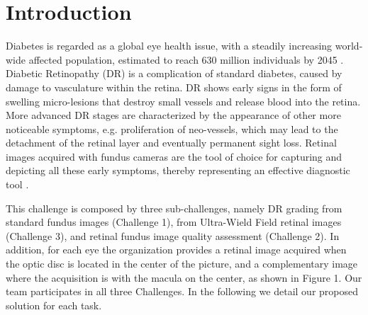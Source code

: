 \section{Introduction}
Diabetes is regarded as a global eye health issue, with a steadily increasing world-wide affected population, estimated to reach 630 million individuals by 2045 \cite{noauthor_who_nodate}. Diabetic Retinopathy (DR) is a complication of standard diabetes, caused by damage to vasculature within the retina. DR shows early signs in the form of swelling micro-lesions that destroy small vessels and release blood into the retina. More advanced DR stages are characterized by the appearance of other more noticeable symptoms, e.g. proliferation of neo-vessels, which may lead to the detachment of the retinal layer and eventually
permanent sight loss. Retinal images acquired with fundus cameras are the tool of choice for capturing and depicting all these early symptoms, thereby representing an effective diagnostic tool \cite{fenner_advances_2018}. 

This challenge is composed by three sub-challenges, namely DR grading from standard fundus images (Challenge 1), from Ultra-Wield Field retinal images (Challenge 3), and retinal fundus image quality assessment (Challenge 2). 
In addition, for each eye the organization provides a retinal image acquired when the optic disc is located in the center of the picture, and a complementary image where the acquisition is with the macula on the center, as shown in Figure 1. Our team  participates in all three Challenges. 
In the following we detail our proposed solution for each task.